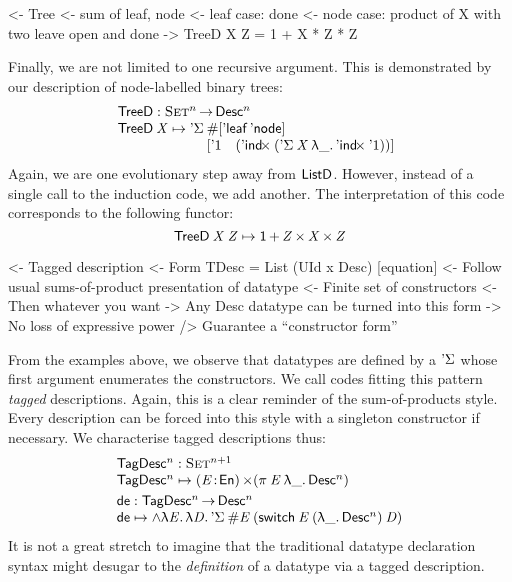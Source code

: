 \begin{wstructure}
<- Tree
    <- sum of leaf, node
    <- leaf case: done
    <- node case: product of X with two leave open and done
    -> TreeD X Z = 1 + X * Z * Z
\end{wstructure}

Finally, we are not limited to one recursive argument. This is
demonstrated by our description of node-labelled binary trees:
%
\[\stk{
\TreeD : \Set^n \To \Desc^n \\
\begin{array}{@{}l@{}l}
\TreeD \: \V{X} \mapsto 
    \DSigma{ & \EnumT{\sqr{ \TreeLeaf\: \TreeNode }} \\}
           { & \sqr{ \DUnit \quad
                     (\DIndx{(\DSigma{\V{X}}{\LAM{\_}\DIndx{\DUnit}})})} }
\end{array}
}\]
%
Again, we are one evolutionary step away from $\ListD$. However,
instead of a single call to the induction code, we add another. The
interpretation of this code corresponds to the following functor:
%
\[    \TreeD\: \V{X}\: \V{Z} \mapsto \Unit \mathop{\D{+}} 
          \V{Z} \Prod \V{X}  \Prod \V{Z}     \]


\begin{wstructure}
<- Tagged description
    <- Form TDesc = List (UId x Desc) [equation]
    <- Follow usual sums-of-product presentation of datatype
        <- Finite set of constructors
        <- Then whatever you want
    -> Any Desc datatype can be turned into this form
        -> No loss of expressive power
        /> Guarantee a ``constructor form''
\end{wstructure}

From the examples above, we observe that datatypes are defined by a
$\SYMBDSigma$ whose first argument enumerates the constructors. We
call codes fitting this pattern \emph{tagged} descriptions. Again,
this is a clear reminder of the sum-of-products style. Every
description can be forced into this style with a singleton constructor
if necessary. We characterise tagged descriptions thus:
\[\stk{
 \TagDesc^n : \Set^{n+1} \\
 \TagDesc^n \mapsto \SIGMA{\V{E}}{\EnumU} (\spi{\V{E}}{\LAM{\_} \Desc^n})
\smallskip\\
\SYMBtoDesc : \TagDesc^n \To \Desc^n \\
\SYMBtoDesc \mapsto
\spl{\LAM{\V{E}}\LAM{\V{D}}
\DSigma{\EnumT{\V{E}}}{(\F{switch}\:\V{E}\:(\LAM{\_}\Desc^n)\:\V{D})}}
}\]
It is not a great stretch to imagine that the traditional datatype
declaration syntax might desugar to the \emph{definition} of a datatype
via a tagged description.

